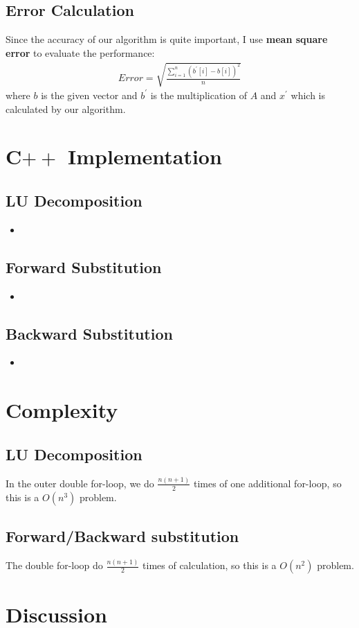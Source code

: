\documentclass{article}
\newcommand{\cppscript}[1]{
    \begin{itemize}
        \item[]
    \end{itemize}
}
\begin{document}
\subsection{Error Calculation}
Since the accuracy of our algorithm is quite important, I use \textbf{mean square error} to evaluate the performance:
\begin{gather}
    Error = \sqrt{\frac{\sum_{i=1}^{n}(b^{'}[i] - b[i])^2}{n}}
\end{gather}
where $b$ is the given vector and $b^{'}$ is the multiplication of $A$ and $x^{'}$ which is calculated by our algorithm.

\newpage

\section{C$++$ Implementation}
\subsection{LU Decomposition}
\cppscript{src/luFact.cpp}
\subsection{Forward Substitution}
\cppscript{src/fwdSubs.cpp}
\subsection{Backward Substitution}
\cppscript{src/bckSubs.cpp}

\section{Complexity}
\label{sec:complexity}
\subsection{LU Decomposition}
In the outer double for-loop, we do $\frac{n(n+1)}{2}$ times of one additional for-loop, so this is a {\boldmath$O(n^3)$} problem.
\subsection{Forward/Backward substitution}
The double for-loop do $\frac{n(n+1)}{2}$ times of calculation, so this is a {\boldmath$O(n^2)$} problem.


\section{Discussion}
\end{document}
